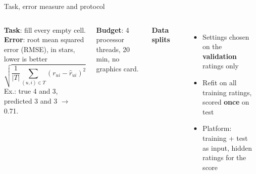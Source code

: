 \documentclass[aspectratio=169,11pt]{beamer}
\newcommand{\key}[1]{\textcolor{accent}{\textbf{#1}}}
\newcommand{\muted}[1]{\textcolor{soft}{#1}}
\begin{document}
\begin{frame}{Task, error measure and protocol}
\begin{columns}[T]
\textbf{Task}: fill every empty cell.\\[0.5em]
\textbf{Error}: root mean squared error (RMSE), in stars, lower is better
\[
  \sqrt{\frac{1}{|T|}\sum_{(u,i)\in T} (r_{ui} - \hat r_{ui})^2}
\]
\muted{\small Ex.: true 4 and 3, predicted 3 and 3 $\to$ 0.71.}

\vspace{0.4em}
\textbf{Budget}: 4 processor threads, 20 min, no graphics card.

\textbf{Data splits}
\begin{center}
\end{center}
\begin{itemize}\small
  \item Settings chosen on the \key{validation} ratings only
  \item Refit on all training ratings, scored \key{once} on test
  \item Platform: training + test as input, hidden ratings for the score
\end{itemize}
\end{columns}
\end{frame}
\end{document}
